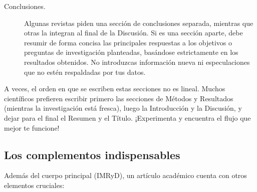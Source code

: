 \begin{description}
	\item[Conclusiones.] Algunas revistas piden una sección de conclusiones separada, mientras que otras la integran al final de la Discusión.
	      Si es una sección aparte, debe resumir de forma concisa las principales respuestas a los objetivos o preguntas de investigación planteadas, basándose estrictamente en los resultados obtenidos.
	      No introduzcas información nueva ni especulaciones que no estén respaldadas por tus datos.
\end{description}

A veces, el orden en que se escriben estas secciones no es lineal.
Muchos científicos prefieren escribir primero las secciones de Métodos y Resultados (mientras la investigación está fresca), luego la Introducción y la Discusión, y dejar para el final el Resumen y el Título.
¡Experimenta y encuentra el flujo que mejor te funcione!

\subsection*{Los complementos indispensables}
\label{sub:complementosarticulo}

Además del cuerpo principal (IMRyD), un artículo académico cuenta con otros elementos cruciales:

